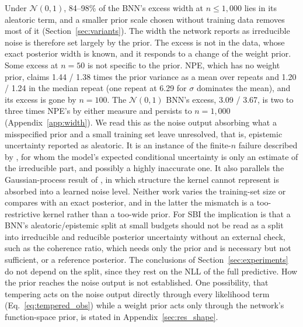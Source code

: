 \documentclass[11pt]{article}
\begin{document}
\label{sec:disc_aleatoric}
Under $\mathcal N(0,1)$, 84--98\% of the BNN's excess width at $n\le1{,}000$ lies in its aleatoric term, and a smaller
prior scale chosen without training data removes most of it (Section~\ref{sec:variants}). The width the network reports
as irreducible noise is therefore set largely by the prior. The excess is not in the data, whose exact posterior width
is known, and it responds to a change of the weight prior. Some excess at $n=50$ is not specific to the prior. NPE,
which has no weight prior, claims 1.44 / 1.38 times the prior variance as a mean over repeats and 1.20 / 1.24 in the
median repeat (one repeat at 6.29 for $\sigma$ dominates the mean), and its excess is gone by $n=100$. The
$\mathcal N(0,1)$ BNN's excess, 3.09 / 3.67, is two to three times NPE's by either measure and persists to
$n=1{,}000$ (Appendix~\ref{app:width}). We read this as the noise output absorbing what a misspecified prior and a small
training set leave unresolved, that is, epistemic uncertainty reported as aleatoric. It is an instance of the finite-$n$
failure described by \citet{bickfordsmith2025rethinking}, for whom the model's expected conditional uncertainty is only
an estimate of the irreducible part, and possibly a highly inaccurate one. It also parallels the Gaussian-process result
of \citet{wendl2026forgetting}, in which structure the kernel cannot represent is absorbed into a learned noise level.
Neither work varies the training-set size or compares with an exact posterior, and in the latter the mismatch is a
too-restrictive kernel rather than a too-wide prior. For SBI the implication is that a BNN's aleatoric/epistemic split
at small budgets should not be read as a split into irreducible and reducible posterior uncertainty without an
external check, such as the coherence ratio, which needs only the prior and is necessary but not sufficient, or a
reference posterior. The conclusions of Section~\ref{sec:experiments} do not depend on the split, since they rest on
the NLL of the full predictive. How the prior reaches the noise output is not established. One possibility, that
tempering acts on the noise output directly through every likelihood term (Eq.~\eqref{eq:tempered_obs}) while a weight
prior acts only through the network's function-space prior, is stated in Appendix~\ref{sec:res_shape}.
\end{document}
